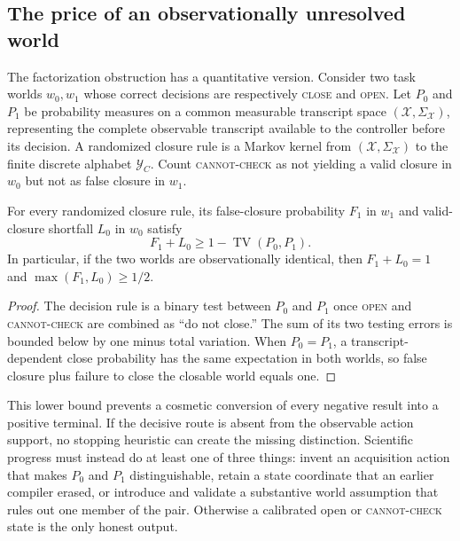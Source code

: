 \subsection{The price of an observationally unresolved world}

The factorization obstruction has a quantitative version.  Consider two task
worlds $w_0,w_1$ whose correct decisions are respectively \textsc{close} and
\textsc{open}. Let $P_0$ and $P_1$ be probability measures on a common
measurable transcript space $(\mathcal X,\Sigma_{\mathcal X})$, representing the
complete observable transcript available to the controller before its decision. A
randomized closure rule is a Markov kernel from
$(\mathcal X,\Sigma_{\mathcal X})$ to
the finite discrete alphabet $\mathcal Y_C$. Count
\textsc{cannot-check} as not yielding a valid closure in $w_0$ but not as false
closure in $w_1$.

\begin{theorem}
\label{thm:indistinguishable}
For every randomized closure rule, its false-closure probability $F_1$ in
$w_1$ and valid-closure shortfall $L_0$ in $w_0$ satisfy
\[
 F_1+L_0\geq 1-\operatorname{TV}(P_0,P_1).
\]
In particular, if the two worlds are observationally identical, then
$F_1+L_0=1$ and $\max(F_1,L_0)\geq 1/2$.
\end{theorem}

\begin{proof}
The decision rule is a binary test between $P_0$ and $P_1$ once
\textsc{open} and \textsc{cannot-check} are combined as ``do not close.''  The
sum of its two testing errors is bounded below by one minus total variation.
When $P_0=P_1$, a transcript-dependent close probability has the same
expectation in both worlds, so false closure plus failure to close the closable
world equals one.
\end{proof}

This lower bound prevents a cosmetic conversion of every negative result into a
positive terminal.  If the decisive route is absent from the observable action
support, no stopping heuristic can create the missing distinction.  Scientific
progress must instead do at least one of three things: invent an acquisition
action that makes $P_0$ and $P_1$ distinguishable, retain a state coordinate
that an earlier compiler erased, or introduce and validate a substantive world
assumption that rules out one member of the pair.  Otherwise a calibrated open
or \textsc{cannot-check} state is the only honest output.

